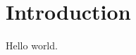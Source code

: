 \documentclass[12pt]{article}
\begin{document}
\maketitle

\section{Introduction}

Hello world.
\end{document}
